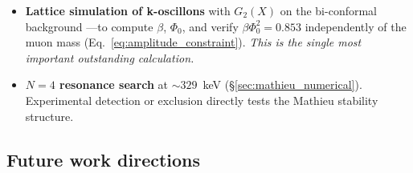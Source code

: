 \documentclass[11pt]{article}
\begin{document}
\begin{itemize}
  \item \textbf{Lattice simulation of k-oscillons}
    with $G_2(X)$ on the bi-conformal background
    ---to compute $\beta$, $\Phi_0$, and verify
    $\beta\Phi_0^2 = 0.853$ independently of the
    muon mass
    (Eq.~\ref{eq:amplitude_constraint}).
    \emph{This is the single most important
    outstanding calculation.}
  \item \textbf{$N = 4$ resonance search}
    at $\sim 329$~keV
    (\S\ref{sec:mathieu_numerical}).
    Experimental detection or exclusion
    directly tests the Mathieu stability
    structure.
\end{itemize}

\subsection*{Future work directions}
\end{document}

